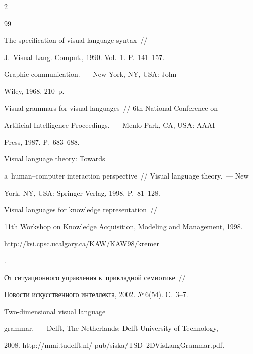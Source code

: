 \begin{multicols}{2}
{{ \begin{thebibliography}{99}




   The specification of visual language syntax~// 


J.~Visual Lang. Comput., 1990. Vol.~1. P.~141--157.




   Graphic communication.~--- New York, NY, USA: John 


Wiley, 1968. 210~p. 




 Visual grammars for visual languages~// 6th National Conference on 


Artificial Intelligence Proceedings.~--- Menlo Park, CA, USA: AAAI 


Press, 1987. P.~683--688. 




   Visual language theory: Towards 


  a~human--computer interaction perspective~// Visual language theory.~--- New 


York, NY, USA: Springer-Verlag, 1998. P.~81--128.




   Visual languages for knowledge representation~//  


11th Workshop on Knowledge Acquisition, Modeling and Management, 1998. {\sf 


http://ksi.cpsc.\linebreak ucalgary.ca/KAW/KAW98/kremer}.




   От ситуационного управления к~прикладной семиотике~// 


Новости искусственного интеллекта, 2002. №\,6(54). С.~3--7. 







    Two-dimensional visual language 


grammar.~--- Delft, The Netherlands: Delft University of Technology, 


2008. {\sf http://mmi.tudelft.nl/ pub/siska/TSD~2DVisLangGrammar.pdf}.





\end{thebibliography}}}
\end{multicols}
